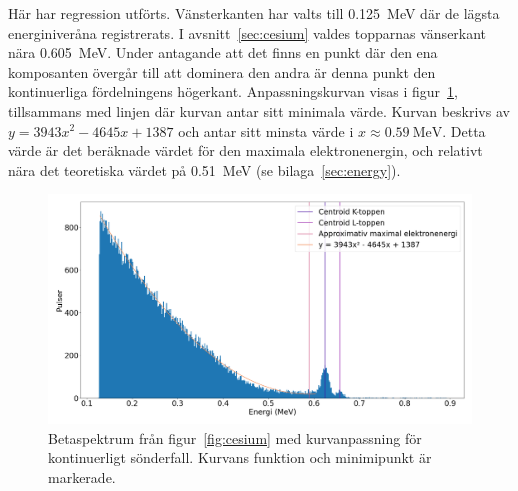 Här har regression utförts. Vänsterkanten har valts till \qty{0.125}{\MeV} där
de lägsta energiniveråna registrerats. I avsnitt~\ref{sec:cesium} valdes
topparnas vänserkant nära \qty{0.605}{\MeV}. Under antagande att det finns en
punkt där den ena komposanten övergår till att dominera den andra är denna
punkt den kontinuerliga fördelningens högerkant. Anpassningskurvan visas i
figur~\ref{fig:cesiumcurve}, tillsammans med linjen där kurvan antar sitt
minimala värde. Kurvan beskrivs av
$y = \num{3943}x^2 - \num{4645}x + \num{1387}$ och antar sitt minsta värde i
$x \approx \qty{0.59}{\MeV}$. Detta värde är det beräknade värdet för den
maximala elektronenergin, och relativt nära det teoretiska värdet på
\qty{0.51}{\MeV} (se bilaga~\ref{sec:energy}).

\begin{figure}[!hp]
    \centering
    \includegraphics[width=\textwidth, keepaspectratio]{../images/cesium_curve.png}
    \caption{
        Betaspektrum från figur~\ref{fig:cesium} med kurvanpassning för
        kontinuerligt sönderfall. Kurvans funktion och minimipunkt är
        markerade.
    }
    \label{fig:cesiumcurve}
\end{figure}
